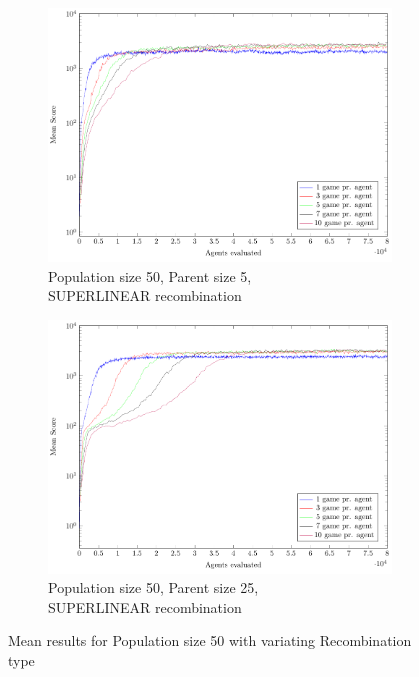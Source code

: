 \begin{figure}
\begin{subfigure}[b]{0.49\textwidth}
    \end{subfigure}
    \begin{subfigure}[b]{0.49\textwidth}
    	\centering
    	\caption{Population size 50, Parent size 5,\\SUPERLINEAR recombination}
        \includegraphics[width=\textwidth]{data/cma_population_offspring/50x_split/superlinear_l50_o5/mean/PlotFile.pdf}
    \end{subfigure}
    \begin{subfigure}[b]{0.49\textwidth}
    	\centering
    	\caption{Population size 50, Parent size 25,\\SUPERLINEAR recombination}
        \includegraphics[width=\textwidth]{data/cma_population_offspring/50x_split/superlinear_l50_o25/mean/PlotFile.pdf}
    \end{subfigure}
    
    \caption{Mean results for Population size 50 with variating Recombination type}
\end{figure}


